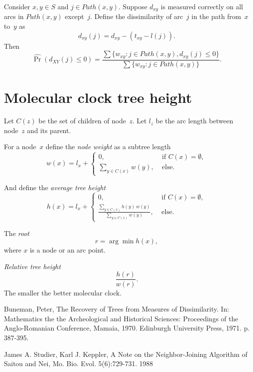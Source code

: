 \documentclass[10pt,a4paper]{article}
\theoremstyle{plain} \newtheorem{Lem}{Lemma}
\begin{document}
Consider $x, y \in S$ and $j \in Path(x,y)$.
Suppose $d_{xy}$ is measured correctly on all arcs in $Path(x,y)$ except~$j$.
Define the dissimilarity of arc~$j$ in the path from~$x$ to~$y$ as
$$ d_{xy}(j) = d_{xy} - (t_{xy} - l(j)). $$
Then
$$ \widehat \Pr (d_{XY}(j) \le 0) = \frac {\sum \{w_{xy}: j \in Path (x,y), d_{xy}(j) \le 0 \}} {\sum \{w_{xy}: j \in Path (x,y)\}}. $$


\section{Molecular clock tree height}

Let $C(z)$ be the set of children of node~$z$.
Let $l_z$ be the arc length between node~$z$ and its parent.

For a node~$x$ define
the {\em node weight} as a subtree length
$$ w(x) =  l_x +
  \begin{cases}
    0, & \textrm { if } C(x) = \emptyset, \\
    \sum_{y \in C(x)} w(y), & \textrm { else}.
   \end{cases}
$$

And define the {\em average tree height}
$$ h(x) = l_x +
  \begin{cases}
    0, & \textrm { if } C(x) = \emptyset, \\
    \frac {\sum_{y \in C(x)} h(y) \ w(y)} {\sum_{y \in C(x)} w(y)}, & \textrm { else}.
   \end{cases}
$$

The {\em root}
$$r = \arg \min h(x),$$
where $x$ is a node or an arc point.

{\em Relative tree height}
$$ \frac {h(r)} {w(r)}. $$
The smaller the better molecular clock.



\begin{thebibliography}{9}
  Buneman, Peter,
  The Recovery of Trees from Measures of Dissimilarity.
  In: Mathematics the the Archeological and Historical Sciences: Proceedings of the Anglo-Romanian Conference,
  Mamaia, 1970. Edinburgh University Press, 1971. p. 387-395.

      James A. Studier, Karl J. Keppler, A Note on the Neighbor-Joining Algorithm of Saitou and Nei,
      Mo. Bio. Evol. 5(6):729-731. 1988
\end{thebibliography}



\end{document}
